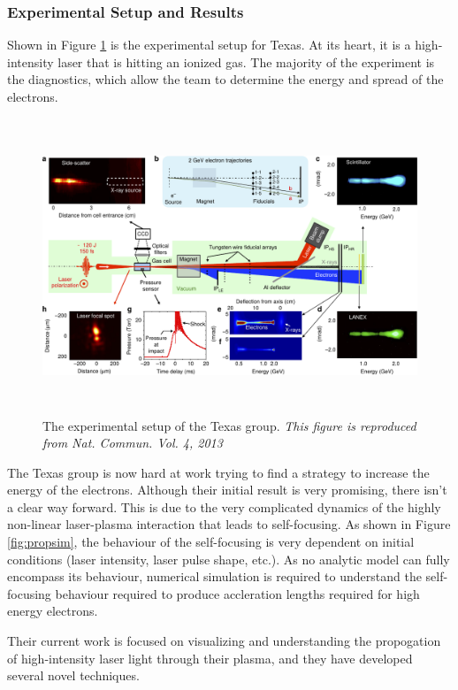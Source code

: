\documentclass[12pt,letter]{article}
\begin{document}
\subsubsection{Experimental Setup and Results}
Shown in Figure \ref{fig:experTexas} is the experimental setup for Texas. At
its heart, it is a high-intensity laser that is hitting an ionized gas. The
majority of the experiment is the diagnostics, which allow the team to determine
the energy and spread of the electrons.
\begin{figure}[b!]
	\includegraphics[width=500pt,height=250pt]{../figures/texasexplayout.pdf}
    \caption{The experimental setup of the Texas group.\cite{Wang2013} \em{This
            figure is reproduced from Nat. Commun. Vol. 4, 2013
            \label{fig:experTexas} 
    }}
\end{figure}

The Texas group is now hard at work trying to find a strategy to increase the
energy of the electrons. Although their initial result is very promising, there
isn't a clear way forward. This is due to the very complicated dynamics of the
highly non-linear laser-plasma interaction that leads to self-focusing. As
shown in Figure \ref{fig:propsim}, the behaviour of the self-focusing is very
dependent on initial conditions (laser intensity, laser pulse shape, etc.). As
no analytic model can fully encompass its behaviour, numerical simulation is
required to understand the self-focusing behaviour required to produce
accleration lengths required for high energy electrons.

Their current work is focused on visualizing and understanding the propogation
of high-intensity laser light through their plasma, and they have developed
several novel techniques.
\end{document}
